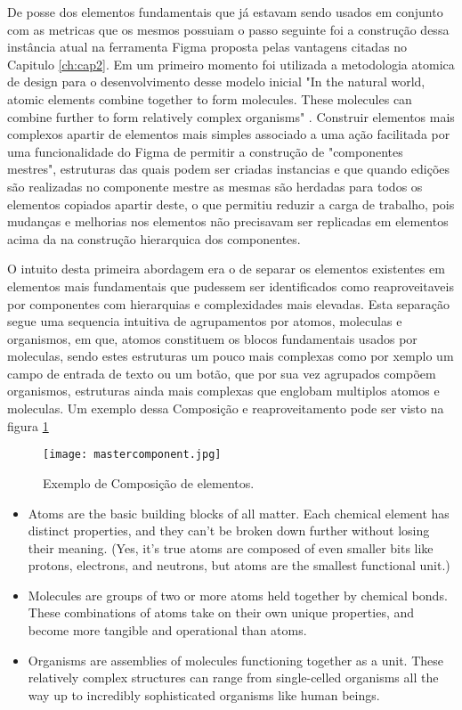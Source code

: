   De posse dos elementos fundamentais que já estavam sendo usados em conjunto com as metricas que os mesmos possuiam o passo seguinte foi a construção dessa instância atual na ferramenta Figma proposta pelas vantagens citadas no Capitulo \ref{ch:cap2}. Em um primeiro momento foi utilizada a metodologia atomica de design para o desenvolvimento desse modelo inicial "In the natural world, atomic elements combine together to form molecules. These molecules can combine further to form relatively complex organisms" \cite{atomic_design}. Construir elementos mais complexos apartir de elementos mais simples associado a uma ação facilitada por uma funcionalidade do Figma de permitir a construção de "componentes mestres", estruturas das quais podem ser criadas instancias e que quando edições são realizadas no componente mestre as mesmas são herdadas para todos os elementos copiados apartir deste, o que permitiu reduzir a carga de trabalho, pois mudanças e melhorias nos elementos não precisavam ser replicadas em elementos acima da na construção hierarquica dos componentes.

  O intuito desta primeira abordagem era o de separar os elementos existentes em elementos mais fundamentais que pudessem ser identificados como reaproveitaveis por componentes com hierarquias e complexidades mais elevadas. Esta separação segue uma sequencia intuitiva de agrupamentos por atomos, moleculas e organismos, em que, atomos constituem os blocos fundamentais usados por moleculas, sendo estes estruturas um pouco mais complexas como por xemplo um campo de entrada de texto ou um botão, que por sua vez agrupados compõem organismos, estruturas ainda mais complexas que englobam multiplos atomos e moleculas. Um exemplo dessa Composição e reaproveitamento pode ser visto na figura \ref{fig:mastercomponent}

  \begin{figure}[h!]
    \texttt{[image: mastercomponent.jpg]}
    \caption{Exemplo de Composição de elementos.}
    \label{fig:mastercomponent}
  \end{figure}

  \begin{citacao}[brazil]
    \begin{itemize}
      \item Atoms are the basic building blocks of all matter. Each chemical element has distinct properties, and they can’t be broken down further without losing their meaning. (Yes, it’s true atoms are composed of even smaller bits like protons, electrons, and neutrons, but atoms are the smallest functional unit.)
      \item Molecules are groups of two or more atoms held together by chemical bonds. These combinations of atoms take on their own unique properties, and become more tangible and operational than atoms.
      \item Organisms are assemblies of molecules functioning together as a unit. These relatively complex structures can range from single-celled organisms all the way up to incredibly sophisticated organisms like human beings.
    \end{itemize}
    \cite{atomic_design}
    \end{citacao}

